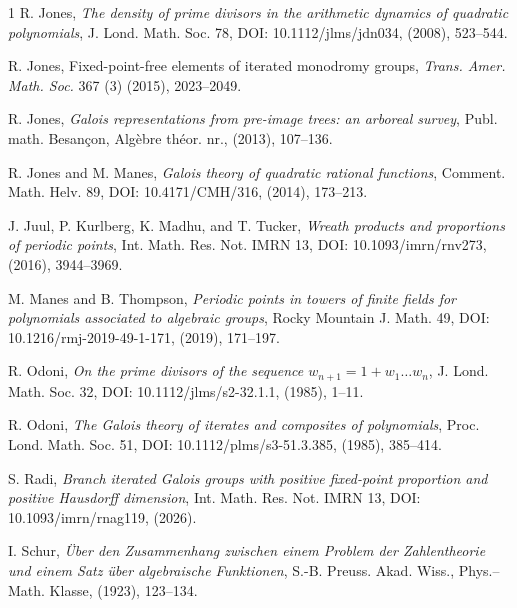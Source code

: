 \documentclass{amsart}
\theoremstyle{definition}
\begin{document}
\begin{thebibliography}{1}
R. Jones, \textit{The density of prime divisors in the arithmetic dynamics of quadratic polynomials}, J. Lond. Math. Soc. 78, DOI: 10.1112/jlms/jdn034, (2008), 523--544.

R. Jones, Fixed-point-free elements of iterated monodromy groups, \textit{Trans. Amer. Math. Soc.} 367 (3) (2015), 2023--2049.

R. Jones, \textit{Galois representations from pre-image trees: an arboreal survey}, Publ. math. Besançon, Algèbre théor. nr., (2013), 107--136.

R. Jones and M. Manes, \textit{Galois theory of quadratic rational functions}, Comment. Math. Helv. 89, DOI: 10.4171/CMH/316, (2014), 173--213.


J. Juul, P. Kurlberg, K. Madhu, and T. Tucker, \textit{Wreath products and proportions of periodic points}, Int. Math. Res. Not. IMRN 13, DOI: 10.1093/imrn/rnv273, (2016), 3944--3969.


M. Manes and B. Thompson, \textit{Periodic points in towers of finite fields for polynomials associated to algebraic groups}, Rocky Mountain J. Math. 49, DOI: 10.1216/rmj-2019-49-1-171, (2019), 171--197.


R. Odoni, \textit{On the prime divisors of the sequence $w_{n+1} = 1 + w_1 \dots w_n$}, J. Lond. Math. Soc. 32, DOI: 10.1112/jlms/s2-32.1.1, (1985), 1--11.

R. Odoni, \textit{The Galois theory of iterates and composites of polynomials}, Proc. Lond. Math. Soc. 51, DOI: 10.1112/plms/s3-51.3.385, (1985), 385--414.

S. Radi, \textit{Branch iterated Galois groups with positive fixed-point proportion and positive Hausdorff dimension}, Int. Math. Res. Not. IMRN 13, DOI: 10.1093/imrn/rnag119, (2026). 

I. Schur, \textit{{\"U}ber den Zusammenhang zwischen einem Problem der Zahlentheorie und einem Satz {\"u}ber algebraische Funktionen}, S.-B. Preuss. Akad. Wiss., Phys.–Math. Klasse, (1923), 123--134.

\end{thebibliography}
\end{document}
